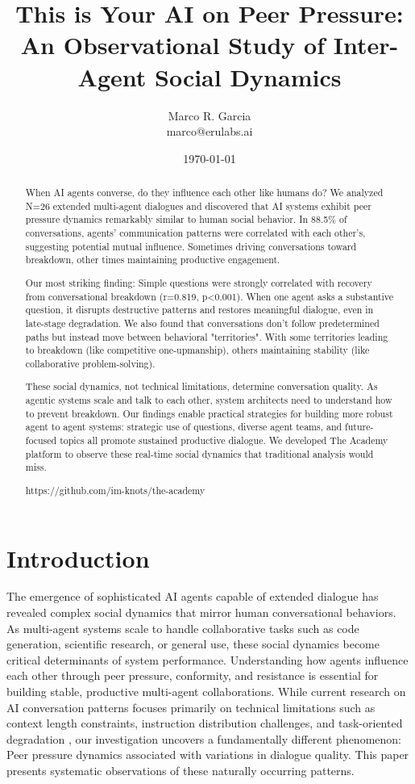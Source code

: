 \documentclass[11pt,letterpaper]{article}
\title{This is Your AI on Peer Pressure: An Observational Study of Inter-Agent Social Dynamics}
\author{
Marco R. Garcia \\
marco@erulabs.ai
}
\date{\today}
\newcommand{\theacademy}{The Academy}
\newcommand{\exponedataTotalSessionsRaw}{26}
\newcommand{\exponedataTotalSessions}{N=\exponedataTotalSessionsRaw}
\newcommand{\exponedataPeerPressurePercentage}{88.5\%}
\newcommand{\exponedataQuestionCorrelation}{0.819}
\newcommand{\exponedataQuestionPValue}{p<0.001}
\begin{document}
\maketitle

\begin{abstract}
When AI agents converse, do they influence each other like humans do? We analyzed \exponedataTotalSessions{} extended multi-agent dialogues and discovered that AI systems exhibit peer pressure dynamics remarkably similar to human social behavior. In \exponedataPeerPressurePercentage{} of conversations, agents’ communication patterns were correlated with each other’s, suggesting potential mutual influence. Sometimes driving conversations toward breakdown, other times maintaining productive engagement.

Our most striking finding: Simple questions were strongly correlated with recovery from conversational breakdown (r=\exponedataQuestionCorrelation{}, \exponedataQuestionPValue{}). When one agent asks a substantive question, it disrupts destructive patterns and restores meaningful dialogue, even in late-stage degradation. We also found that conversations don't follow predetermined paths but instead move between behavioral "territories". With some territories leading to breakdown (like competitive one-upmanship), others maintaining stability (like collaborative problem-solving).

These social dynamics, not technical limitations, determine conversation quality. As agentic systems scale and talk to each other, system architects need to understand how to prevent breakdown. Our findings enable practical strategies for building more robust agent to agent systems: strategic use of questions, diverse agent teams, and future-focused topics all promote sustained productive dialogue. We developed \theacademy{} platform to observe these real-time social dynamics that traditional analysis would miss.

https://github.com/im-knots/the-academy
\end{abstract}

\section{Introduction}

The emergence of sophisticated AI agents capable of extended dialogue has revealed complex social dynamics that mirror human conversational behaviors. As multi-agent systems scale to handle collaborative tasks such as code generation, scientific research, or general use, these social dynamics become critical determinants of system performance. Understanding how agents influence each other through peer pressure, conformity, and resistance is essential for building stable, productive multi-agent collaborations. While current research on AI conversation patterns focuses primarily on technical limitations such as context length constraints, instruction distribution challenges, and task-oriented degradation \citep{laban2025lost}, our investigation uncovers a fundamentally different phenomenon: Peer pressure dynamics associated with variations in dialogue quality. This paper presents systematic observations of these naturally occurring patterns.
\end{document}
